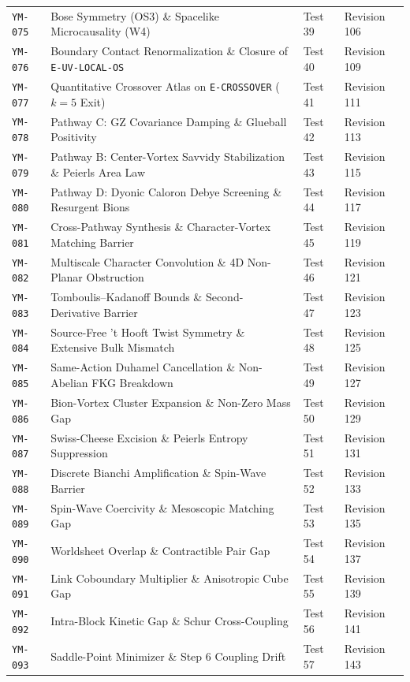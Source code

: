 \documentclass[11pt,a4paper]{article}
\theoremstyle{definition}
\theoremstyle{remark}
\begin{document}
\begin{table}[htbp]
{\begin{tabular}{@{}llll@{}}
\texttt{YM-075}  & Bose Symmetry (OS3) \& Spacelike Microcausality (W4) & Test 39 & Revision 106 \\
\texttt{YM-076}  & Boundary Contact Renormalization \& Closure of \texttt{E-UV-LOCAL-OS} & Test 40 & Revision 109 \\
\texttt{YM-077}  & Quantitative Crossover Atlas on \texttt{E-CROSSOVER} ($k=5$ Exit) & Test 41 & Revision 111 \\
\texttt{YM-078}  & Pathway C: GZ Covariance Damping \& Glueball Positivity & Test 42 & Revision 113 \\
\texttt{YM-079}  & Pathway B: Center-Vortex Savvidy Stabilization \& Peierls Area Law & Test 43 & Revision 115 \\
\texttt{YM-080}  & Pathway D: Dyonic Caloron Debye Screening \& Resurgent Bions & Test 44 & Revision 117 \\
\texttt{YM-081}  & Cross-Pathway Synthesis \& Character-Vortex Matching Barrier & Test 45 & Revision 119 \\
\texttt{YM-082}  & Multiscale Character Convolution \& 4D Non-Planar Obstruction & Test 46 & Revision 121 \\
\texttt{YM-083}  & Tomboulis--Kadanoff Bounds \& Second-Derivative Barrier & Test 47 & Revision 123 \\
\texttt{YM-084}  & Source-Free 't Hooft Twist Symmetry \& Extensive Bulk Mismatch & Test 48 & Revision 125 \\
\texttt{YM-085}  & Same-Action Duhamel Cancellation \& Non-Abelian FKG Breakdown & Test 49 & Revision 127 \\
\texttt{YM-086}  & Bion-Vortex Cluster Expansion \& Non-Zero Mass Gap & Test 50 & Revision 129 \\
\texttt{YM-087}  & Swiss-Cheese Excision \& Peierls Entropy Suppression & Test 51 & Revision 131 \\
\texttt{YM-088}  & Discrete Bianchi Amplification \& Spin-Wave Barrier & Test 52 & Revision 133 \\
\texttt{YM-089}  & Spin-Wave Coercivity \& Mesoscopic Matching Gap & Test 53 & Revision 135 \\
\texttt{YM-090}  & Worldsheet Overlap \& Contractible Pair Gap & Test 54 & Revision 137 \\
\texttt{YM-091}  & Link Coboundary Multiplier \& Anisotropic Cube Gap & Test 55 & Revision 139 \\
\texttt{YM-092}  & Intra-Block Kinetic Gap \& Schur Cross-Coupling & Test 56 & Revision 141 \\
\texttt{YM-093}  & Saddle-Point Minimizer \& Step 6 Coupling Drift & Test 57 & Revision 143 \\

\end{tabular}}
\end{table}
\end{document}
